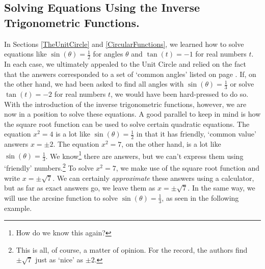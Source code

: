 \subsection{Solving Equations Using the Inverse Trigonometric Functions.}

In Sections \ref{TheUnitCircle} and \ref{CircularFunctions}, we learned how to solve equations like $\sin(\theta) = \frac{1}{2}$ for angles $\theta$ and $\tan(t) = -1$ for real numbers $t$. In each case, we ultimately appealed to the Unit Circle and relied on the fact that the answers corresponded to a set of `common angles' listed on page \pageref{commonanglesunitcircle}.  If, on the other hand, we had been asked to find all angles with $\sin(\theta) = \frac{1}{3}$ or solve $\tan(t) = -2$ for real numbers $t$, we would have been hard-pressed to do so.  With the introduction of the inverse trigonometric functions, however, we are now in a position to solve these equations. A good parallel to keep in mind is how the square root function can be used to solve certain quadratic equations.  The equation $x^2 = 4$ is a lot like  $\sin(\theta) = \frac{1}{2}$ in that it has friendly, `common value' answers  $x = \pm 2$.  The equation $x^2 = 7$, on the other hand, is a lot like $\sin(\theta) = \frac{1}{3}$.  We know\footnote{How do we know this again?} there are answers, but we can't express them using `friendly' numbers.\footnote{This is all, of course, a matter of opinion.  For the record, the authors find $\pm \sqrt{7}$ just as `nice' as $\pm 2$.}  To solve $x^2 = 7$, we make use of the square root function and write $x = \pm \sqrt{7}$. We can certainly \textit{approximate} these answers using a calculator, but as far as exact answers go, we leave them as $x = \pm \sqrt{7}$.  In the same way, we will use the arcsine function to solve $\sin(\theta) = \frac{1}{3}$, as seen in the following example.

